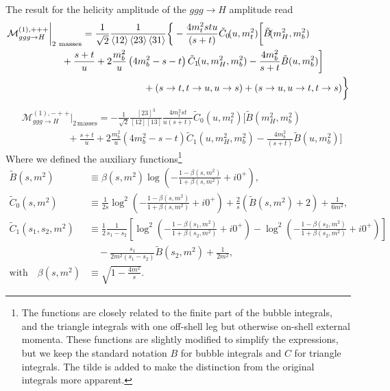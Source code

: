 The result for the helicity amplitude of the $ggg \rightarrow H$ amplitude read
\begin{equation}
\begin{split}
&\mathcal{M}^{(1),+++}_{ggg \rightarrow H} \bigg \vert_{2\ \text{masses}} = \frac{1}{\sqrt{2}} \frac{1}{\braket{12}\braket{23} \braket{31}} \bigg \lbrace -  \frac{4 m_t^2 s t u}{(s + t)} \tilde{C}_0\!(u, m_t^2) \bigg [ \tilde{B}\!(m_H^2, m_b^2)  \\
& \hspace{2cm} + \frac{s + t}{u} + 2 \frac{m_b^2}{u} \left( 4 m_b^2 - s - t \right) \tilde{C}_1\!(u, m_H^2, m_b^2) - \frac{4 m_b^2}{s + t} \tilde{B}(u, m_b^2)  \bigg ] \\
& \hspace{5cm} + (s \rightarrow t, t \rightarrow u, u \rightarrow s) + (s \rightarrow u, u \rightarrow t, t \rightarrow s)\bigg \rbrace
\label{eq:5:ggg_ppp}
\end{split}
\end{equation}
%
%
\begin{equation}
\begin{split}
&\mathcal{M}^{(1),-++}_{ggg \rightarrow H} \bigg \vert_{2\, \text{masses}} = -\frac{1}{\sqrt{2}} \frac{[23]^3}{[12][13]} \frac{4 m_t^2 s t }{u(s + t)} \tilde{C}_0\!(u, m_t^2) \bigg [ \tilde{B}\!(m_H^2, m_b^2) \\
& \hspace{2cm} + \frac{s + t}{u} + 2 \frac{m_b^2}{u} \left(4 m_b^2 - s - t\right) \tilde{C}_1\!(u, m_H^2, m_b^2) - \frac{4 m_b^2}{(s + t)} \tilde{B}\!(u, m_b^2) \bigg ]
\label{eq:5:ggg_mpp}
\end{split}
\end{equation}
Where we defined the auxiliary functions\footnote{The functions are closely related to the finite part of the bubble integrals, and the triangle integrals with one off-shell leg but otherwise on-shell external momenta. These functions are slightly modified to simplify the expressions, but we keep the standard notation $B$ for bubble integrals and $C$ for triangle integrals. The tilde is added to make the distinction from the original integrals more apparent.}
\begin{equation}
\begin{split}
\tilde{B}\!(s, m^2) &\equiv \beta(s, m^2) \log\!\left(- \frac{1 - \beta(s, m^2)}{1 + \beta(s, m^2)} + i 0^+ \right), \\
\tilde{C}_0\!(s, m^2) &\equiv \frac{1}{2 s} \log^2\!\left(- \frac{1 - \beta(s, m^2)}{1 + \beta(s, m^2)} + i 0^+ \right) + \frac{2}{s} \left(\tilde{B}\!(s, m^2) + 2 \right) + \frac{1}{6 m^2}, \\
\tilde{C}_1\!(s_1, s_2, m^2) &\equiv \frac{1}{2} \frac{1}{s_1 - s_2} \left[ \log^2\!\left(-\frac{1 - \beta(s_1, m^2)}{1 + \beta(s_2, m^2)} + i 0^+ \right) - \log^2\!\left(- \frac{1 - \beta(s_2, m^2)}{1 + \beta(s_2, m^2)} + i0^+\right) \right] \\
& \quad - \frac{s_1}{2 m^2 (s_1 - s_2)} \tilde{B}(s_2, m^2) + \frac{1}{2m^2}, \\
\text{with} \quad \beta(s, m^2) &\equiv \sqrt{1 - \frac{4 m^2}{s}}.
\label{eq:5:function_definitions}
\end{split}
\end{equation}
